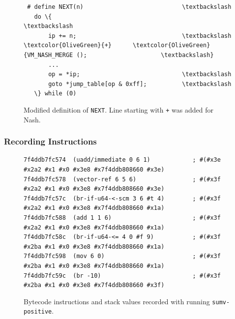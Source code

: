 \documentclass[preprint, 10pt]{sigplanconf}
\begin{document}
\begin{figure}
  \centering
  \small
\begin{Verbatim}
 # define NEXT(n)                            \textbackslash
   do \{                                      \textbackslash
       ip += n;                              \textbackslash
\textcolor{OliveGreen}{+}      \textcolor{OliveGreen}{VM_NASH_MERGE ();                     \textbackslash}
       ...
       op = *ip;                             \textbackslash
       goto *jump_table[op & 0xff];          \textbackslash
   \} while (0)
\end{Verbatim}
\caption{Modified definition of \texttt{NEXT}. Line starting with \texttt{+} was
  added for Nash.}
\label{fig:cnext}
\end{figure}

\subsubsection{Recording Instructions}

\begin{figure}
  \centering
  \small
\begin{verbatim}
7f4ddb7fc574  (uadd/immediate 0 6 1)            ; #(#x3e #x2a2 #x1 #x0 #x3e8 #x7f4ddb808660 #x3e)
7f4ddb7fc578  (vector-ref 6 5 6)                ; #(#x3f #x2a2 #x1 #x0 #x3e8 #x7f4ddb808660 #x3e)
7f4ddb7fc57c  (br-if-u64-<-scm 3 6 #t 4)        ; #(#x3f #x2a2 #x1 #x0 #x3e8 #x7f4ddb808660 #x1a)
7f4ddb7fc588  (add 1 1 6)                       ; #(#x3f #x2a2 #x1 #x0 #x3e8 #x7f4ddb808660 #x1a)
7f4ddb7fc58c  (br-if-u64-<= 4 0 #f 9)           ; #(#x3f #x2ba #x1 #x0 #x3e8 #x7f4ddb808660 #x1a)
7f4ddb7fc598  (mov 6 0)                         ; #(#x3f #x2ba #x1 #x0 #x3e8 #x7f4ddb808660 #x1a)
7f4ddb7fc59c  (br -10)                          ; #(#x3f #x2ba #x1 #x0 #x3e8 #x7f4ddb808660 #x3f)
\end{verbatim}
\caption{Bytecode instructions and stack values recorded with running
  \texttt{sumv-positive}.}
\label{fig:trace}
\end{figure}
\end{document}
